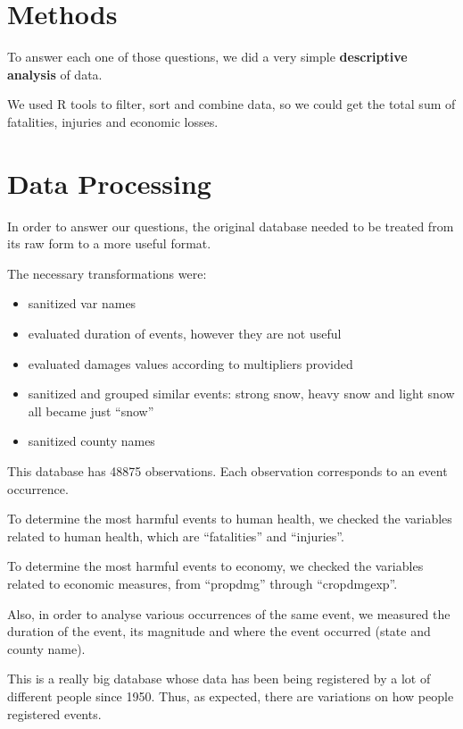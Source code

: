\documentclass[]{article}
\providecommand{\tightlist}{%
  \setlength{\itemsep}{0pt}\setlength{\parskip}{0pt}}
\begin{document}
\section{Methods}\label{methods}

To answer each one of those questions, we did a very simple
\textbf{descriptive analysis} of data.

We used R tools to filter, sort and combine data, so we could get the
total sum of fatalities, injuries and economic losses.

\section{Data Processing}\label{data-processing}

In order to answer our questions, the original database needed to be
treated from its raw form to a more useful format.

The necessary transformations were:

\begin{itemize}
\tightlist
\item
  sanitized var names
\item
  evaluated duration of events, however they are not useful
\item
  evaluated damages values according to multipliers provided
\item
  sanitized and grouped similar events: strong snow, heavy snow and
  light snow all became just ``snow''
\item
  sanitized county names
\end{itemize}

This database has 48875 observations. Each observation corresponds to an
event occurrence.

To determine the most harmful events to human health, we checked the
variables related to human health, which are ``fatalities'' and
``injuries''.

To determine the most harmful events to economy, we checked the
variables related to economic measures, from ``propdmg'' through
``cropdmgexp''.

Also, in order to analyse various occurrences of the same event, we
measured the duration of the event, its magnitude and where the event
occurred (state and county name).

This is a really big database whose data has been being registered by a
lot of different people since 1950. Thus, as expected, there are
variations on how people registered events.
\end{document}
